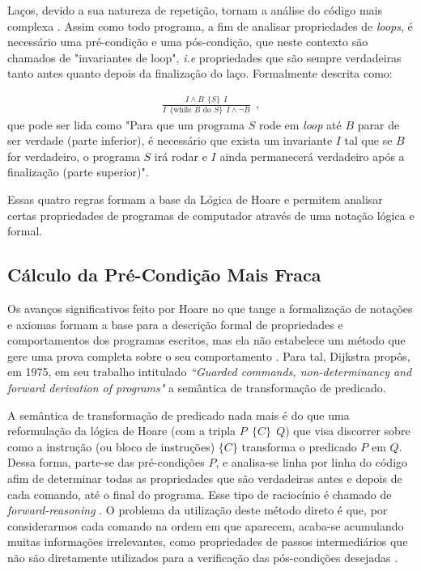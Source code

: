 \documentclass{article}
\begin{document}
Laços, devido a sua natureza de repetição, tornam a análise do código mais complexa \cite{blanchard2020introduction}. Assim como todo programa, a fim de analisar propriedades de \emph{loops}, é necessário uma pré-condição e uma pós-condição, que neste contexto são chamados de "invariantes de loop", \emph{i.e} propriedades que são sempre verdadeiras tanto antes quanto depois da finalização do laço. Formalmente descrita como:

\begin{align}
    \frac{I \land B \ \ \{ S\} \ \  I}
    {I \ \ \{\text{while } B \text{ do } S \} \ \ I \land \neg B}\ \ ,
\end{align}
que pode ser lida como "Para que um programa $S$ rode em \emph{loop} até $B$ parar de ser verdade (parte inferior), é necessário que exista um invariante $I$ tal que se $B$ for verdadeiro, o programa $S$ irá rodar e $I$ ainda permanecerá verdadeiro após a finalização (parte superior)".

Essas quatro regras formam a base da Lógica de Hoare e permitem analisar certas propriedades de programas de computador através de uma notação lógica e formal.


\subsection{Cálculo da Pré-Condição Mais Fraca}\label{sec:wp}

Os avanços significativos feito por Hoare no que tange a formalização de notações e axiomas formam a base para a descrição formal de propriedades e comportamentos dos programas escritos, mas ela não estabelece um método que gere uma prova completa sobre o seu comportamento \cite{blanchard2020introduction}. Para tal, Dijkstra propôs, em 1975, em seu trabalho intitulado \emph{``Guarded commands, non-determinancy and forward derivation of programs"} a semântica de transformação de predicado.

A semântica de transformação de predicado nada mais é do que uma reformulação da lógica de Hoare (com a tripla $P \ \ \{C\} \ \ Q$) que visa discorrer sobre como a instrução (ou bloco de instruções) $\{C\}$ transforma o predicado $P$ em $Q$. Dessa forma, parte-se das pré-condições $P$, e analisa-se linha por linha do código afim de determinar todas as propriedades que são verdadeiras antes e depois de cada comando, até o final do programa. Esse tipo de raciocínio é chamado de \emph{forward-reasoning} \cite{blanchard2020introduction}.
O problema da utilização deste método direto é que, por considerarmos cada comando na ordem em que aparecem, acaba-se acumulando muitas informações irrelevantes, como propriedades de passos intermediários que não são diretamente utilizados para a verificação das pós-condições desejadas \cite{freundHoareLogic}. 
\end{document}
